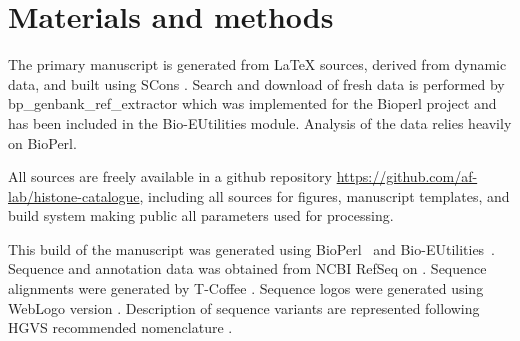 \section{Materials and methods}

  The primary manuscript is generated from \LaTeX{} sources, derived
  from dynamic data, and built using SCons \citep{SCons2005}.
  Search and download of fresh data is performed by bp\_genbank\_ref\_extractor
  which was implemented for the Bioperl project \citep{bioperl} and has
  been included in the Bio-EUtilities module. Analysis of the data relies
  heavily on BioPerl.

  All sources are freely available in a github repository
  \url{https://github.com/af-lab/histone-catalogue}, including all
  sources for figures, manuscript templates, and build system making public
  all parameters used for processing.

  This build of the manuscript was generated using BioPerl~\BioPerlVersion{}
  and Bio-EUtilities~\BioEUtilitiesVersion{}.
  Sequence and annotation data was obtained from NCBI RefSeq \citep{OLearyRefseq2016}
  on \printdate{\SequencesDate{}}.
  Sequence alignments were generated by T-Coffee \TCoffeVersion{} \citep{tcoffee2000}.
  Sequence logos were generated using WebLogo version \WebLogoVersion{} \citep{weblogo}.
  Description of sequence variants are represented following HGVS
  recommended nomenclature \citep{mutnomenclature2016}.
